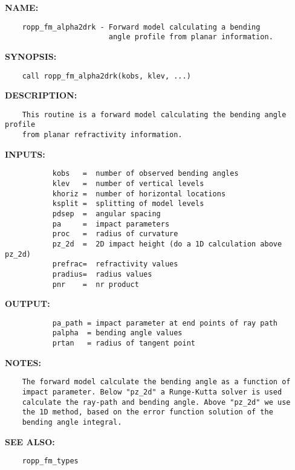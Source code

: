 \label{ch:robo7}
\label{ch:BendingAngle2d_ropp_fm_alpha2drk}
\textbf{NAME:}\hspace{0.08in}\begin{Verbatim}
    ropp_fm_alpha2drk - Forward model calculating a bending
                        angle profile from planar information.
\end{Verbatim}
\textbf{SYNOPSIS:}\hspace{0.08in}\begin{Verbatim}
    call ropp_fm_alpha2drk(kobs, klev, ...)
\end{Verbatim}
\textbf{DESCRIPTION:}\hspace{0.08in}\begin{Verbatim}
    This routine is a forward model calculating the bending angle profile
    from planar refractivity information.  
\end{Verbatim}
\textbf{INPUTS:}\hspace{0.08in}\begin{Verbatim}
           kobs   =  number of observed bending angles 
           klev   =  number of vertical levels
           khoriz =  number of horizontal locations
           ksplit =  splitting of model levels
           pdsep  =  angular spacing
           pa     =  impact parameters
           proc   =  radius of curvature 
           pz_2d  =  2D impact height (do a 1D calculation above pz_2d)
           prefrac=  refractivity values
           pradius=  radius values
           pnr    =  nr product 
\end{Verbatim}
\textbf{OUTPUT:}\hspace{0.08in}\begin{Verbatim}
           pa_path = impact parameter at end points of ray path
           palpha  = bending angle values
           prtan   = radius of tangent point 
\end{Verbatim}
\textbf{NOTES:}\hspace{0.08in}\begin{Verbatim}
    The forward model calculate the bending angle as a function of
    impact parameter. Below "pz_2d" a Runge-Kutta solver is used
    calculate the ray-path and bending angle. Above "pz_2d" we use
    the 1D method, based on the error function solution of the 
    bending angle integral.  
\end{Verbatim}
\textbf{SEE ALSO:}\hspace{0.08in}\begin{Verbatim}
    ropp_fm_types
\end{Verbatim}

